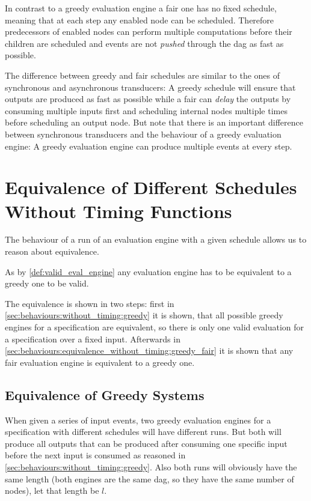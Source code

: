 In contrast to a greedy evaluation engine a fair one has no fixed schedule, meaning that at each step any enabled node can be scheduled.
Therefore predecessors of enabled nodes can perform multiple computations before their children are scheduled and events are not \emph{pushed} through the \gls{dag} as fast as possible.

The difference between greedy and fair schedules are similar to the ones of synchronous and asynchronous transducers: A greedy schedule will ensure that outputs are produced as fast as possible while a fair can \emph{delay} the outputs by consuming multiple inputs first and scheduling internal nodes multiple times before scheduling an output node.
But note that there is an important difference between synchronous transducers and the behaviour of a greedy evaluation engine: A greedy evaluation engine can produce multiple events at every step.

\section{Equivalence of Different Schedules Without Timing Functions}
\label{sec:behaviours:equivalence_without_timing}

The behaviour of a run of an evaluation engine with a given schedule allows us to reason about equivalence.

As by \cref{def:valid_eval_engine} any evaluation engine has to be equivalent to a greedy one to be valid.

The equivalence is shown in two steps: first in \cref{sec:behaviours:without_timing:greedy} it is shown, that all possible greedy engines for a specification are equivalent, so there is only one valid evaluation for a specification over a fixed input.
Afterwards in \cref{sec:behaviours:equivalence_without_timing:greedy_fair} it is shown that any fair evaluation engine is equivalent to a greedy one.


\subsection{Equivalence of Greedy Systems}
\label{sec:behaviours:equivalence_without_timing:greedy}

When given a series of input events, two greedy evaluation engines for a specification with different schedules will have different runs.
But both will produce all outputs that can be produced after consuming one specific input before the next input is consumed as reasoned in \cref{sec:behaviours:without_timing:greedy}.
Also both runs will obviously have the same length (both engines are the same \gls{dag}, so they have the same number of nodes), let that length be \(l\).

